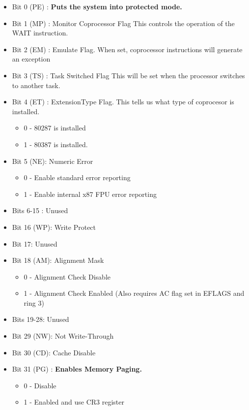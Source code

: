 \documentclass[document.tex]{subfiles}
\begin{document}
\begin{english}
\begin{itemize}
\item Bit 0 (PE) : \textbf{Puts the system into protected mode.}
\item  Bit 1 (MP) : Monitor Coprocessor Flag This controls the operation of the WAIT instruction.
\item Bit 2 (EM) : Emulate Flag. When set, coprocessor instructions will generate an exception
\item Bit 3 (TS) : Task Switched Flag This will be set when the processor switches to another task.
\item Bit 4 (ET) : ExtensionType Flag. This tells us what type of coprocesor is installed.
\begin{itemize}
\item 0 - 80287 is installed
\item 1 - 80387 is installed.
\end{itemize}
\item Bit 5 (NE): Numeric Error
\begin{itemize}
\item 0 - Enable standard error reporting
\item 1 - Enable internal x87 FPU error reporting
\end{itemize}
\item  Bits 6-15 : Unused
\item Bit 16 (WP): Write Protect
\item Bit 17: Unused
\item Bit 18 (AM): Alignment Mask
\begin{itemize}
\item 0 - Alignment Check Disable
\item 1 - Alignment Check Enabled (Also requires AC flag set in EFLAGS and ring 3)
\end{itemize}
\item Bits 19-28: Unused
\item Bit 29 (NW): Not Write-Through
\item Bit 30 (CD): Cache Disable
\item Bit 31 (PG) : \textbf{Enables Memory Paging.}
\begin{itemize}
\item 0 - Disable
\item 1 - Enabled and use CR3 register
\end{itemize}

\end{itemize}
\end{english}
\end{document}
